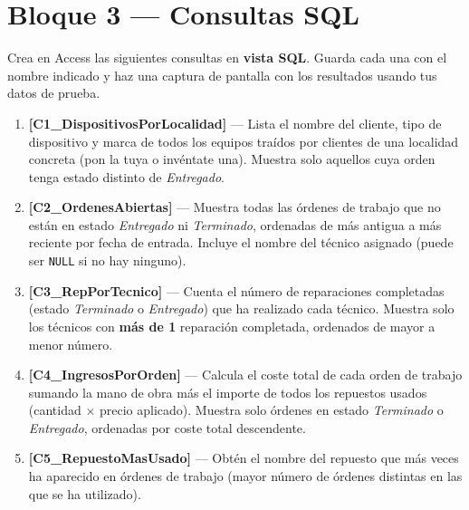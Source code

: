 \documentclass[12pt,a4paper]{article}
\begin{document}
\vspace{0.4cm}

\section{Bloque 3 — Consultas SQL}

\begin{consultabox}
Crea en Access las siguientes consultas en \textbf{vista SQL}. Guarda cada una con el nombre
indicado y haz una captura de pantalla con los resultados usando tus datos de prueba.

\vspace{0.3cm}
\begin{enumerate}[label=\bfseries C\arabic*.]

  \item \textbf{[C1\_DispositivosPorLocalidad]} —
        Lista el nombre del cliente, tipo de dispositivo y marca de todos los equipos
        traídos por clientes de una localidad concreta (pon la tuya o invéntate una).
        Muestra solo aquellos cuya orden tenga estado distinto de \textit{Entregado}.

  \item \textbf{[C2\_OrdenesAbiertas]} —
        Muestra todas las órdenes de trabajo que no están en estado \textit{Entregado} ni
        \textit{Terminado}, ordenadas de más antigua a más reciente por fecha de entrada.
        Incluye el nombre del técnico asignado (puede ser \texttt{NULL} si no hay ninguno).

  \item \textbf{[C3\_RepPorTecnico]} —
        Cuenta el número de reparaciones completadas (estado \textit{Terminado} o
        \textit{Entregado}) que ha realizado cada técnico.
        Muestra solo los técnicos con \textbf{más de 1} reparación completada,
        ordenados de mayor a menor número.

  \item \textbf{[C4\_IngresosPorOrden]} —
        Calcula el coste total de cada orden de trabajo sumando la mano de obra más
        el importe de todos los repuestos usados (cantidad $\times$ precio aplicado).
        Muestra solo órdenes en estado \textit{Terminado} o \textit{Entregado},
        ordenadas por coste total descendente.

  \item \textbf{[C5\_RepuestoMasUsado]} —
        Obtén el nombre del repuesto que más veces ha aparecido en órdenes de trabajo
        (mayor número de órdenes distintas en las que se ha utilizado).


\end{enumerate}
\end{consultabox}
\end{document}

